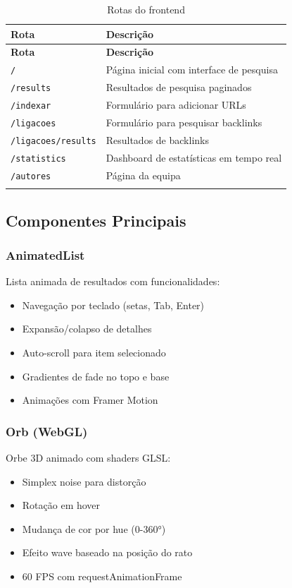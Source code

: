 \documentclass[12pt,a4paper]{article}
\begin{document}
\begin{longtable}{|p{4cm}|p{9cm}|}
\hline
\textbf{Rota} & \textbf{Descrição} \\
\hline
\endfirsthead
\hline
\textbf{Rota} & \textbf{Descrição} \\
\hline
\endhead
\hline
\endfoot

\texttt{/} & Página inicial com interface de pesquisa \\
\texttt{/results} & Resultados de pesquisa paginados \\
\texttt{/indexar} & Formulário para adicionar URLs \\
\texttt{/ligacoes} & Formulário para pesquisar backlinks \\
\texttt{/ligacoes/results} & Resultados de backlinks \\
\texttt{/statistics} & Dashboard de estatísticas em tempo real \\
\texttt{/autores} & Página da equipa \\
\hline
\caption{Rotas do frontend}
\end{longtable}

\subsection{Componentes Principais}

\subsubsection{AnimatedList}
Lista animada de resultados com funcionalidades:
\begin{itemize}
    \item Navegação por teclado (setas, Tab, Enter)
    \item Expansão/colapso de detalhes
    \item Auto-scroll para item selecionado
    \item Gradientes de fade no topo e base
    \item Animações com Framer Motion
\end{itemize}

\subsubsection{Orb (WebGL)}
Orbe 3D animado com shaders GLSL:
\begin{itemize}
    \item Simplex noise para distorção
    \item Rotação em hover
    \item Mudança de cor por hue (0-360°)
    \item Efeito wave baseado na posição do rato
    \item 60 FPS com requestAnimationFrame
\end{itemize}
\end{document}
